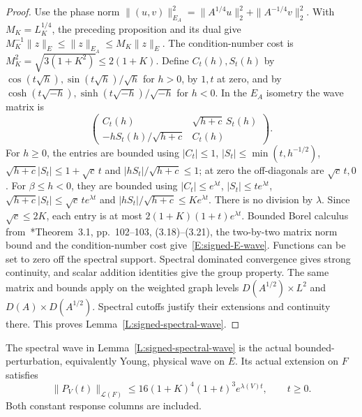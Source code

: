 \begin{proof}
  Use the phase norm
  $\|(u,v)\|_{E_A}^2=\|A^{1/4}u\|_2^2+\|A^{-1/4}v\|_2^2$.
  With $M_K=L_K^{1/4}$, the preceding proposition and its dual give
  $M_K^{-1}\|z\|_E\le\|z\|_{E_A}\le M_K\|z\|_E$.
  The condition-number cost is
  $M_K^2=\sqrt{3(1+K^2)}\le2(1+K)$.
  Define $C_t(h),S_t(h)$ by
  $\cos(t\sqrt h),\sin(t\sqrt h)/\sqrt h$ for $h>0$,
  by $1,t$ at zero, and by
  $\cosh(t\sqrt{-h}),\sinh(t\sqrt{-h})/\sqrt{-h}$ for $h<0$.
  In the $E_A$ isometry the wave matrix is
  \begin{equation}\label{E:signed-spectral-matrix}
    \begin{pmatrix}
      C_t(h)&\sqrt{h+c}\,S_t(h)\\
      -hS_t(h)/\sqrt{h+c}&C_t(h)
    \end{pmatrix}.
  \end{equation}
  For $h\ge0$, the entries are bounded using
  $|C_t|\le1$, $|S_t|\le\min(t,h^{-1/2})$,
  $\sqrt{h+c}|S_t|\le1+\sqrt c\,t$ and
  $|hS_t|/\sqrt{h+c}\le1$; at zero the off-diagonals are
  $\sqrt c\,t,0$.
  For $\beta\le h<0$, they are bounded using
  $|C_t|\le e^{\lambda t}$, $|S_t|\le te^{\lambda t}$,
  $\sqrt{h+c}|S_t|\le\sqrt c\,te^{\lambda t}$ and
  $|hS_t|/\sqrt{h+c}\le Ke^{\lambda t}$.
  There is no division by $\lambda$.
  Since $\sqrt c\le2K$, each entry is at most
  $2(1+K)(1+t)e^{\lambda t}$.
  Bounded Borel calculus from~\cite{teschl:14:mathematical}*{Theorem~3.1,
  pp.~102--103, (3.18)--(3.21)}, the two-by-two matrix norm
  bound and the condition-number cost give~\eqref{E:signed-E-wave}.
  Functions can be set to zero off the spectral support.
  Spectral dominated convergence gives strong continuity, and
  scalar addition identities give the group property.
  The same matrix and bounds apply on the weighted graph levels
  $D(A^{1/2})\times L^2$ and $D(A)\times D(A^{1/2})$.
  Spectral cutoffs justify their extensions and continuity there.
  This proves Lemma~\ref{L:signed-spectral-wave}.
\end{proof}

\begin{proposition}
  \label{P:signed-physical-wave}
  The spectral wave in Lemma~\ref{L:signed-spectral-wave} is the
  actual bounded-perturbation, equivalently Young, physical wave on $E$.
  Its actual extension on $F$ satisfies
  \begin{equation}\label{E:signed-F-wave}
    \|P_V(t)\|_{\mathcal L(F)}
    \le16(1+K)^4(1+t)^3e^{\lambda(V)t},\qquad t\ge0.
  \end{equation}
  Both constant response columns are included.
\end{proposition}

